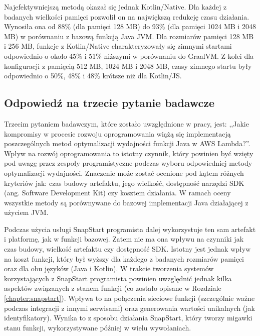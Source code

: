 Najefektywniejszą metodą okazał się jednak Kotlin/Native.
Dla każdej z badanych wielkości pamięci pozwolił on na największą redukcję czasu działania.
Wynosiła ona od 88\% (dla pamięci 128 MB) do 93\% (dla pamięci 1024 MB i 2048 MB) w porównaniu z bazową funkcją Java JVM.
Dla rozmiarów pamięci 128 MB i 256 MB, funkcje z Kotlin/Native charakteryzowały się zimnymi startami odpowiednio o około 45\% i 51\% niższymi w porównaniu do GraalVM.
Z kolei dla konfiguracji z pamięcią 512 MB, 1024 MB i 2048 MB, czasy zimnego startu były odpowiednio o 50\%, 48\% i 48\% krótsze niż dla Kotlin/JS.

\subsection*{Odpowiedź na trzecie pytanie badawcze}

Trzecim pytaniem badawczym, które zostało uwzględnione w pracy, jest: ,,Jakie kompromisy w procesie rozwoju oprogramowania wiążą się implementacją poszczególnych metod optymalizacji wydajności funkcji Java w AWS Lambda?''.
Wpływ na rozwój oprogramowania to istotny czynnik, który powinien być wzięty pod uwagę przez zespoły programistyczne podczas wyboru odpowiedniej metody optymalizacji wydajności.
Znaczenie może zostać ocenione pod kątem różnych kryteriów jak: czas budowy artefaktu, jego wielkość, dostępność narzędzi SDK (ang. Software Development Kit) czy kosztem działania.
W ramach oceny wszystkie metody są porównywane do bazowej implementacji Java działającej z użyciem JVM.

Podczas użycia usługi SnapStart programista dalej wykorzystuje ten sam artefakt i platformę, jak w funkcji bazowej.
Zatem nie ma ona wpływu na czynniki jak czas budowy, wielkość artefaktu czy dostępność SDK.
Istotny jest jednak wpływ na koszt funkcji, który był wyższy dla każdego z badanych rozmiarów pamięci oraz dla obu języków (Java i Kotlin).
W trakcie tworzenia systemów korzystających z SnapStart programista powinien uwzględnić jednak kilka aspektów związanych z stanem funkcji (co zostało opisane w Rozdziale \ref{chapter:snapstart}).
Wpływa to na połączenia sieciowe funkcji (szczególnie ważne podczas integracji z innymi serwisami) oraz generowania wartości unikalnych (jak identyfikatory).
Wynika to z sposobu działania SnapStart, który tworzy migawki stanu funkcji, wykorzystywane później w wielu wywołaniach.

